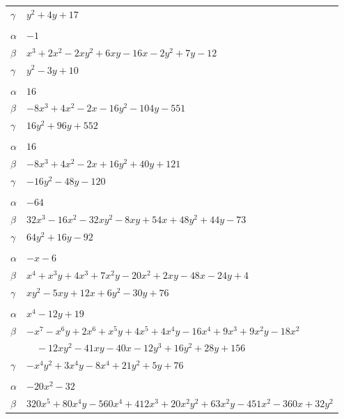 \documentclass[11pt]{article}
\begin{document}
\begin{longtable}{@{}ll@{}}
$\gamma$ & $y^{2}+4y+17$\\
\addlinespace[3pt]
\multicolumn{2}{@{}l}{$\{i,j\}=\{3,9\}$, $k_{ij}=2\cdot 3^{2}$}\\
$\alpha$ & $-1$\\
$\beta$ & $x^{3}+2x^{2}-2xy^{2}+6xy-16x-2y^{2}+7y-12$\\
$\gamma$ & $y^{2}-3y+10$\\
\addlinespace[3pt]
\multicolumn{2}{@{}l}{$\{i,j\}=\{4,7\}$, $k_{ij}=3^{2}\cdot 19^{2}$}\\
$\alpha$ & $16$\\
$\beta$ & $-8x^{3}+4x^{2}-2x-16y^{2}-104y-551$\\
$\gamma$ & $16y^{2}+96y+552$\\
\addlinespace[3pt]
\multicolumn{2}{@{}l}{$\{i,j\}=\{4,8\}$, $k_{ij}=3^{3}\cdot 11$}\\
$\alpha$ & $16$\\
$\beta$ & $-8x^{3}+4x^{2}-2x+16y^{2}+40y+121$\\
$\gamma$ & $-16y^{2}-48y-120$\\
\addlinespace[3pt]
\multicolumn{2}{@{}l}{$\{i,j\}=\{4,11\}$, $k_{ij}=5^{2}\cdot 11$}\\
$\alpha$ & $-64$\\
$\beta$ & $32x^{3}-16x^{2}-32xy^{2}-8xy+54x+48y^{2}+44y-73$\\
$\gamma$ & $64y^{2}+16y-92$\\
\addlinespace[3pt]
\multicolumn{2}{@{}l}{$\{i,j\}=\{5,10\}$, $k_{ij}=2^{2}\cdot 3^{3}$}\\
$\alpha$ & $-x-6$\\
$\beta$ & $x^{4}+x^{3}y+4x^{3}+7x^{2}y-20x^{2}+2xy-48x-24y+4$\\
$\gamma$ & $xy^{2}-5xy+12x+6y^{2}-30y+76$\\
\addlinespace[3pt]
\multicolumn{2}{@{}l}{$\{i,j\}=\{5,11\}$, $k_{ij}=2^{5}\cdot 5$}\\
$\alpha$ & $x^{4}-12y+19$\\
$\beta$ & $-x^{7}-x^{6}y+2x^{6}+x^{5}y+4x^{5}+4x^{4}y-16x^{4}+9x^{3}+9x^{2}y-18x^{2}$\\
 & $\quad -12xy^{2}-41xy-40x-12y^{3}+16y^{2}+28y+156$\\
$\gamma$ & $-x^{4}y^{2}+3x^{4}y-8x^{4}+21y^{2}+5y+76$\\
\addlinespace[3pt]
\multicolumn{2}{@{}l}{$\{i,j\}=\{6,9\}$, $k_{ij}=2^{5}\cdot 7^{2}$}\\
$\alpha$ & $-20x^{2}-32$\\
$\beta$ & $320x^{5}+80x^{4}y-560x^{4}+412x^{3}+20x^{2}y^{2}+63x^{2}y-451x^{2}-360x+32y^{2}$\\

\end{longtable}
\end{document}
